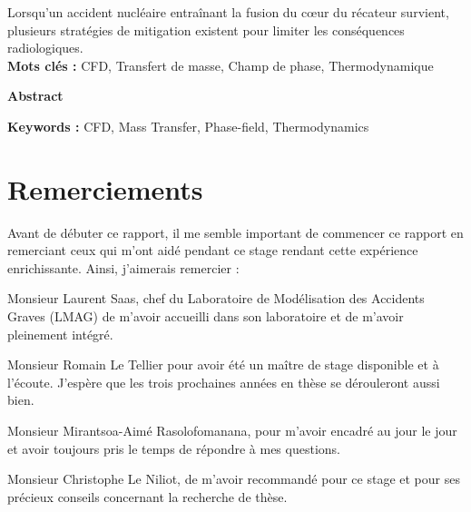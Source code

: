 \documentclass[a4paper,11pt]{report}    %
\begin{document}
Lorsqu'un accident nucléaire entraînant la fusion du c\oe ur du récateur survient, plusieurs stratégies de mitigation existent pour limiter les conséquences radiologiques.
\vspace{0.3cm}\\
\noindent\textbf{Mots clés :} CFD, Transfert de masse, Champ de phase, Thermodynamique
\begin{center}
	\Large
	\vspace{0.6cm}
	\textbf{Abstract}
\end{center}

\noindent\textbf{Keywords :} CFD, Mass Transfer, Phase-field, Thermodynamics


\newpage
\hypersetup{pageanchor=true}
\tableofcontents


\newpage




\newpage
%
\section*{Remerciements}
Avant de débuter ce rapport, il me semble important de commencer ce rapport en remerciant ceux qui m’ont aidé pendant ce stage rendant cette expérience enrichissante. Ainsi, j'aimerais remercier : 

Monsieur Laurent Saas, chef du Laboratoire de Modélisation des Accidents Graves (LMAG) de m'avoir accueilli dans son laboratoire et de m'avoir pleinement intégré.

Monsieur Romain Le Tellier pour avoir été un maître de stage disponible et à l'écoute. J'espère que les trois prochaines années en thèse se dérouleront aussi bien.

Monsieur Mirantsoa-Aimé Rasolofomanana, pour m'avoir encadré au jour le jour et avoir toujours pris le temps de répondre à mes questions.

Monsieur Christophe Le Niliot, de m'avoir recommandé pour ce stage et pour ses précieux conseils concernant la recherche de thèse.
\end{document}
